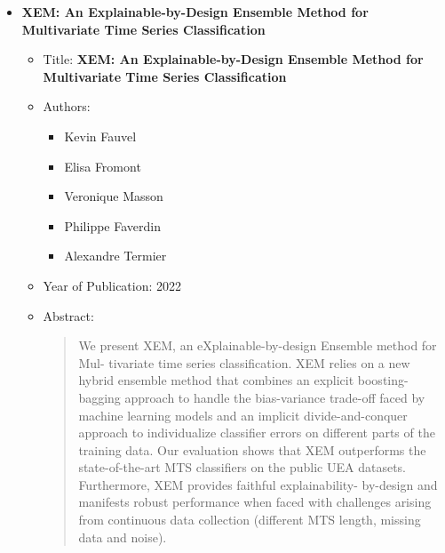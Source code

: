 \documentclass{article}
\begin{document}
\begin{itemize}
\begin{itemize}
\begin{abstract}
            \end{abstract}
        
        \end{itemize}
        
        \item \textbf{XEM: An Explainable-by-Design Ensemble Method
        for Multivariate Time Series Classification}
        
        \begin{itemize}
        
            \item Title: \textbf{XEM: An Explainable-by-Design Ensemble Method
            for Multivariate Time Series Classification}
        
            \item Authors:
        
            \begin{itemize}
        
                \item Kevin Fauvel
        
                \item Elisa Fromont
        
                \item Veronique Masson
        
                \item Philippe Faverdin
        
                \item Alexandre Termier
        
            \end{itemize}
        
            \item Year of Publication: 2022
        
            \item Abstract:
        
            \begin{abstract}
        
                We present XEM, an eXplainable-by-design Ensemble method for Mul-
                tivariate time series classification. XEM relies on a new hybrid ensemble method
                that combines an explicit boosting-bagging approach to handle the bias-variance
                trade-off faced by machine learning models and an implicit divide-and-conquer
                approach to individualize classifier errors on different parts of the training data.
                Our evaluation shows that XEM outperforms the state-of-the-art MTS classifiers
                on the public UEA datasets. Furthermore, XEM provides faithful explainability-
                by-design and manifests robust performance when faced with challenges arising
                from continuous data collection (different MTS length, missing data and noise).
        

\end{abstract}
\end{itemize}
\end{itemize}
\end{document}
